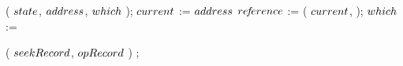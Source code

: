 \begin{limitscope}
\begin{algorithm}[tbh]
{{{			   
				 \AddToTop( $state$, $address$, $which$ ); 
				 \label{lin:local-seek|successor:while:traversal:stack}
				 \label{lin:local-seek|successor:while:traversal:advance:begin}
			   $current$ := $address$\;
			   $re\!f\!erence$ := \GetChild( $current$, \LEFT{} ); 
			   $which$ := \LEFT{}\;
				 \label{lin:local-seek|successor:while:traversal:advance:end}
				 \label{lin:local-seek|successor:while:traversal:end}
			}
			\label{lin:local-seek|successor:while:end}
	 }
	
	 \PopulateSeekRecord( $seekRecord$, $opRecord$ )\;
	 \Return \True;
	 \label{lin:local-seek|successor:end}
}
\end{algorithm}
\end{limitscope}